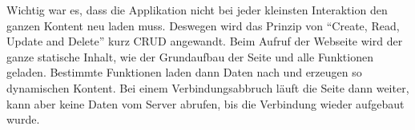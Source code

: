 Wichtig war es, dass die Applikation nicht bei jeder kleinsten Interaktion den ganzen Kontent neu laden muss.
Deswegen wird das Prinzip von ``Create, Read, Update and Delete'' kurz CRUD angewandt.
Beim Aufruf der Webseite wird der ganze statische Inhalt, wie der Grundaufbau der Seite und alle Funktionen geladen. Bestimmte Funktionen laden dann Daten nach und erzeugen so dynamischen Kontent.
Bei einem Verbindungsabbruch läuft die Seite dann weiter, kann aber keine Daten vom Server abrufen, bis die Verbindung wieder aufgebaut wurde.\\
\\
